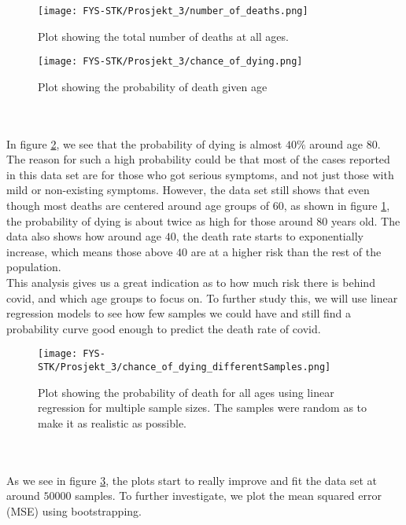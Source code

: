 \documentclass[english,notitlepage,reprint,nofootinbib]{revtex4-1}  %
\begin{document}
\begin{figure}[H]
    \centering
    \texttt{[image: FYS-STK/Prosjekt\_3/number\_of\_deaths.png]}
    \caption{Plot showing the total number of deaths at all ages.}
    \label{fig: 13}
\end{figure}

\begin{figure}[H]
    \centering
    \texttt{[image: FYS-STK/Prosjekt\_3/chance\_of\_dying.png]}
    \caption{Plot showing the probability of death given age}
    \label{fig: 14}
\end{figure}
\\
\\
In figure \ref{fig: 14}, we see that the probability of dying is almost $40 \%$ around age 80. The reason for such a high probability could be that most of the cases reported in this data set are for those who got serious symptoms, and not just those with mild or non-existing symptoms. However, the data set still shows that even though most deaths are centered around age groups of $60$, as shown in figure \ref{fig: 13}, the probability of dying is about twice as high for those around $80$ years old. The data also shows how around age $40$, the death rate starts to exponentially increase, which means those above $40$ are at a higher risk than the rest of the population. 
\\
This analysis gives us a great indication as to how much risk there is behind covid, and which age groups to focus on. To further study this, we will use linear regression models to see how few samples we could have and still find a probability curve good enough to predict the death rate of covid.
\begin{figure}[H]
    \centering
    \texttt{[image: FYS-STK/Prosjekt\_3/chance\_of\_dying\_differentSamples.png]}
    \caption{Plot showing the probability of death for all ages using linear regression for multiple sample sizes. The samples were random as to make it as realistic as possible.}
    \label{fig: 15}
\end{figure}
\\
\\
As we see in figure \ref{fig: 15}, the plots start to really improve and fit the data set at around $50 000$ samples. To further investigate, we plot the mean squared error (MSE) using bootstrapping. 
\end{document}
